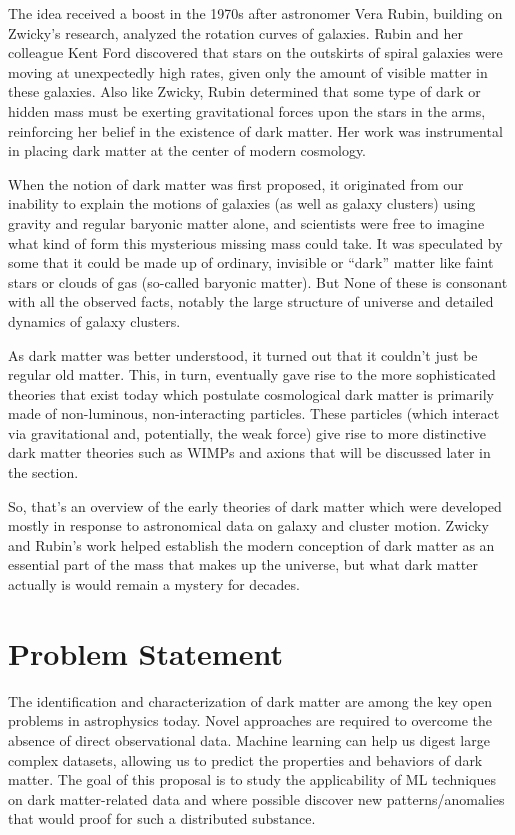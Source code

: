 The idea received a boost in the 1970s after astronomer Vera Rubin, building on Zwicky’s research, analyzed the rotation curves of galaxies.\cite{rubin1970} Rubin and her colleague Kent Ford discovered that stars on the outskirts of spiral galaxies were moving at unexpectedly high rates, given only the amount of visible matter in these galaxies. Also like Zwicky, Rubin determined that some type of dark or hidden mass must be exerting gravitational forces upon the stars in the arms, reinforcing her belief in the existence of dark matter. Her work was instrumental in placing dark matter at the center of modern cosmology.

When the notion of dark matter was first proposed, it originated from our inability to explain the motions of galaxies (as well as galaxy clusters) using gravity and regular baryonic matter alone, and scientists were free to imagine what kind of form this mysterious missing mass could take. It was speculated by some that it could be made up of ordinary, invisible or “dark” matter like faint stars or clouds of gas (so-called baryonic matter). But None of these is consonant with all the observed facts, notably the large structure of universe and detailed dynamics of galaxy clusters.

As dark matter was better understood, it turned out that it couldn’t just be regular old matter. This, in turn, eventually gave rise to the more sophisticated theories that exist today which postulate cosmological dark matter is primarily made of non-luminous, non-interacting particles. These particles (which interact via gravitational and, potentially, the weak force) give rise to more distinctive dark matter theories such as WIMPs and axions that will be discussed later in the section.

So, that's an overview of the early theories of dark matter which were developed mostly in response to astronomical data on galaxy and cluster motion. Zwicky and Rubin’s work helped establish the modern conception of dark matter as an essential part of the mass that makes up the universe, but what dark matter actually is would remain a mystery for decades.

 
 
\section{Problem Statement}
 The identification and characterization of dark matter are among the key open problems in astrophysics today. Novel approaches are required to overcome the absence of direct observational data. Machine learning can help us digest large complex datasets, allowing us to predict the properties and behaviors of dark matter. The goal of this proposal is to study the applicability of ML techniques on dark matter-related data and where possible discover new patterns/anomalies that would proof for such a distributed substance.

